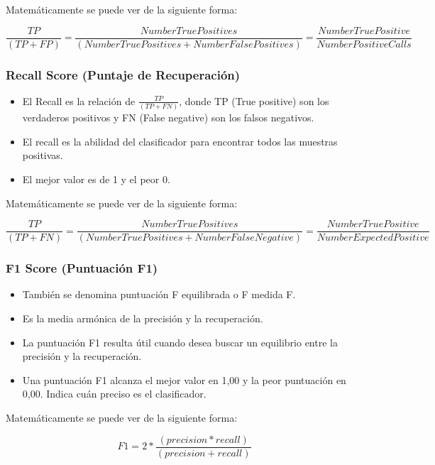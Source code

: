     Matemáticamente se puede ver de la siguiente forma: \par

    $$\frac{TP}{(TP + FP)} = \frac{Number True Positives}{(Number True Positives + Number False Positives)} = \frac{Number True Positive}{Number Positive Calls} $$

\subsubsection{  Recall Score (Puntaje de Recuperación)} \par
\begin{itemize}
    \item El Recall es la relación de $\frac{TP}{(TP + FN)}$, donde TP (True positive) son los verdaderos positivos y FN (False negative) son los falsos negativos.
    \item  El recall es la abilidad del clasificador para encontrar todos las muestras positivas.
    \item El mejor valor es de 1 y el peor 0.
\end{itemize}
    Matemáticamente se puede ver de la siguiente forma: \par

    $$\frac{TP}{(TP + FN)} = \frac{Number True Positives}{(Number True Positives + Number False Negative)} = \frac{Number True Positive}{Number Expected Positive} $$

\subsubsection{ F1 Score (Puntuación F1)} \par
\begin{itemize}
    \item También se denomina puntuación F equilibrada o F medida F. 
    \item Es la media armónica de la precisión y la recuperación. 
    \item La puntuación F1 resulta útil cuando desea buscar un equilibrio entre la precisión y la recuperación.
    \item Una puntuación F1 alcanza el mejor valor en 1,00 y la peor puntuación en 0,00. Indica cuán preciso es el clasificador.
\end{itemize}

Matemáticamente se puede ver de la siguiente forma: \par

    $$F1 = 2 * \frac{(precision * recall)}{(precision + recall)}$$


